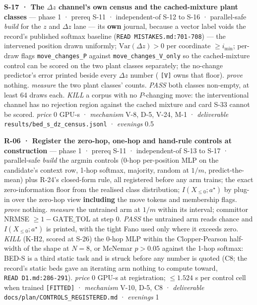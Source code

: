 \documentclass[11pt,a4paper]{article}
\theoremstyle{plain}
\theoremstyle{definition}
\theoremstyle{remark}
\begin{document}
\textbf{S-17 · The \(\Delta z\) channel's own census and the
cached-mixture plant classes} --- phase 1 · prereq S-11 · independent-of
S-12 to S-16 · parallel-safe \emph{build} for the \(z\) and \(\Delta z\)
lane --- its \textbf{own} journal, because a vector label voids the
record's published softmax baseline (\texttt{READ\ MISTAKES.md:701-708})
--- the intervened position drawn uniformly;
\(\mathrm{Var}(\Delta z)>0\) per coordinate \(\ge i_{\min}\); per-draw
flags \texttt{move\_changes\_P} against \texttt{move\_changes\_V\_only}
so the cached-mixture control can be scored on the two plant classes
separately; the no-change predictor's error printed beside every
\(\Delta z\) number (\citep{vakalis-2026-interventiongap}
\texttt{{[}V{]}} owns that floor). \emph{prove} nothing. \emph{measure}
the two plant classes' counts. \emph{PASS} both classes non-empty, at
least 64 draws each. \emph{KILL} a corpus with no \(P\)-changing move:
the interventional channel has no rejection region against the cached
mixture and card S-33 cannot be scored. \emph{price} \(0\) GPU-s ·
\emph{mechanism} V-8, D-5, V-24, M-1 · \emph{deliverable}
\texttt{results/bed\_s\_dz\_census.jsonl} · \emph{evenings} 0.5

\textbf{R-06 · Register the zero-hop, one-hop and hand-rule controls at
construction} --- phase 1 · prereq S-11 · independent-of S-13 to S-17 ·
parallel-safe \emph{build} the argmin controls (0-hop per-position MLP
on the candidate's context row, 1-hop softmax, majority, random at
\(1/m\), predict-the-mean) plus R-24's closed-form rule, all registered
before any arm trains; the exact zero-information floor from the
realised class distribution; \(I(X_{\le0};a^\star)\) by plug-in over the
zero-hop view \textbf{including} the move tokens and membership flags.
\emph{prove} nothing. \emph{measure} the untrained arm at \(1/m\) within
its interval; committor NRMSE \(\ge1-\mathrm{GATE\_TOL}\) at step 0.
\emph{PASS} the untrained arm reads chance and \(I(X_{\le0};a^\star)\)
is printed, with the tight Fano used only where it exceeds zero.
\emph{KILL} (K-H2, scored at S-26) the 0-hop MLP within the
Clopper-Pearson half-width of the shape at \(N=8\), or McNemar
\(p>0.05\) against the 1-hop softmax: BED-S is a third static task and
is struck before any number is quoted (C8; the record's static beds gave
an iterating arm nothing to compute toward,
\texttt{READ\ D1.md:286-291}). \emph{price} \(0\) GPU-s at registration;
\(\le1.524\) s per control cell when trained \texttt{{[}FITTED{]}} ·
\emph{mechanism} V-10, D-5, C8 · \emph{deliverable}
\texttt{docs/plan/CONTROLS\_REGISTERED.md} · \emph{evenings} 1
\end{document}
